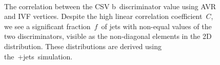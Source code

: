 \begin{figure}
\begin{centering}
 \\
\caption[The correlation between the CSV b~discriminators using AVR or IVF vertices]{The correlation between the CSV b~discriminator value using AVR and IVF vertices. Despite the high linear correlation coefficient~$C$, we see a significant fraction~$f$~of jets with non-equal values of the two discriminators, visible as the non-diagonal elements in the 2D distribution. These distributions are derived using the~\ttbar+jets~simulation.}
\label{fig:btag_csv_correlation}
\end{centering}
\end{figure}

